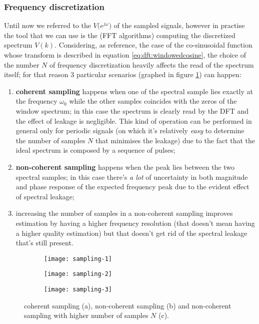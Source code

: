 		\subsubsection{Frequency discretization}
		Until now we referred to the \dtft $V\big(e^{j\omega}\big)$ of the sampled signals, however in practise the tool that we can use is the \dft (FFT algorithms) computing the discretized spectrum $V(k)$. Considering, as reference, the case of the co-sinusoidal function whose transform is described in equation \ref{eq:dft:windowedcosine}, the choice of the number $N$ of frequency discretization heavily affects the read of the spectrum itself; for that reason 3 particular scenarios (graphed in figure \ref{fig:dft:samplingvariation}) can happen:
		\begin{enumerate}
			\item \textbf{coherent sampling} happens when one of the spectral sample lies exactly at the frequency $\omega_0$ while the other samples coincides with the zeros of the window spectrum; in this case the spectrum is clearly read by the DFT and the effect of leakage is negligible. This kind of operation can be performed in general only for periodic signals (on which it's relatively \textit{easy} to determine the number of samples $N$ that minimises the leakage) due to the fact that the ideal spectrum is composed by a sequence of pulses;
			
			\item \textbf{non-coherent sampling} happens when the peak lies between the two spectral samples; in this case there's \textit{a lot} of uncertainty in both magnitude and phase response of the expected frequency peak due to the evident effect of spectral leakage;
			
			\item increasing the number of samples in a non-coherent sampling improves estimation by having a higher frequency resolution (that doesn't mean having a higher quality estimation) but that doesn't get rid of the spectral leakage that's still present.			 
		\end{enumerate}
		
		\begin{figure}[bt]
			\begin{subfigure}{0.32\linewidth}
				\centering \texttt{[image: sampling-1]} \caption{}
			\end{subfigure}
			\begin{subfigure}{0.32\linewidth}
				\centering \texttt{[image: sampling-2]} \caption{}
			\end{subfigure}
			\begin{subfigure}{0.32\linewidth}
				\centering \texttt{[image: sampling-3]} \caption{}
			\end{subfigure}
			\caption{coherent sampling (a), non-coherent sampling (b) and non-coherent sampling with higher number of samples $N$ (c).}
			\label{fig:dft:samplingvariation}
		\end{figure}
				
